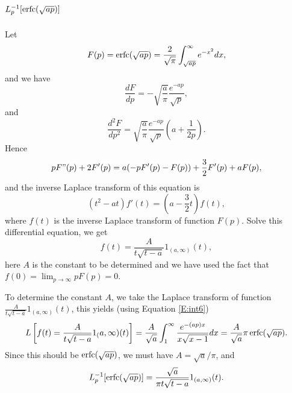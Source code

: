 \section{$L_p^{-1}[ \operatorname*{erfc}(\sqrt{ap}) ] $ }
Let 
\[
  F(p) = \operatorname*{erfc}(\sqrt{ap}) 
       = \frac{2}{\sqrt{\pi}} \int_{\sqrt{ap}}^{\infty} e^{-x^2} dx,
\]
and we have
\[
  \frac{dF}{dp} = - \sqrt{\frac{a}{\pi}} \frac{e^{-ap}}{\sqrt{p}},
\]
and
\[
  \frac{d^2F}{dp^2} = \sqrt{\frac{a}{\pi}} \frac{e^{-ap}}{\sqrt{p}} 
                      \left( a + \frac{1}{2p} \right).
\]
Hence
\[
  p F"(p) + 2 F'(p) = a (-p F'(p) - F(p) ) + \frac{3}{2} F'(p) + a F(p),
\]
and the inverse Laplace transform of this equation is
\[
  (t^2-a t) f'(t) = (a-\frac{3}{2} t) f(t),
\]
where $f(t)$ is the inverse Laplace transform of function $F(p)$.
Solve this differential equation, we get
\[
  f(t) = \frac{A}{t \sqrt{t-a}} 1_{(a,\infty)}(t),
\]
here $A$ is the constant to be determined and we have used the fact that
$f(0)=\lim_{p \to \infty} p F(p) = 0$.

To determine the constant $A$, we take the Laplace transform of function
$\frac{A}{t \sqrt{t-a}} 1_{(a,\infty)}(t)$, this yields (using Equation
\ref{E:int6})
\[
  L\left[ f(t) = \frac{A}{t \sqrt{t-a}} 1_(a,\infty)(t) \right]
    = \frac{A}{\sqrt{a}} \int_1^{\infty} \frac{e^{-(ap)x}}{x \sqrt{x-1}} dx
    = \frac{A}{\sqrt{a}} \pi \operatorname*{erfc}(\sqrt{ap}).
\]
Since this should be $\operatorname*{erfc}(\sqrt{ap})$, we must have
$A=\sqrt{a}/\pi$, and 
\begin{equation}
  L_p^{-1}[ \operatorname*{erfc}(\sqrt{ap}) ] = \frac{\sqrt{a}}{\pi t \sqrt{t-a}}
                                 1_{(a,\infty)}(t).
\end{equation}


